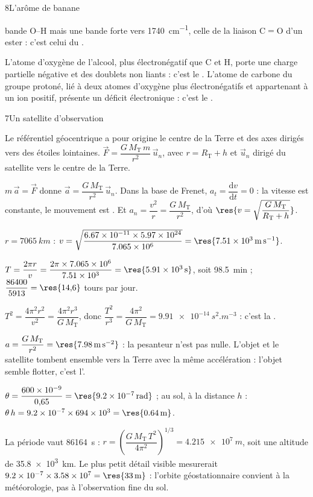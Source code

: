 \begin{corrigeBac}{8}{L'arôme de banane}
\begin{questions}
bande O--H mais une bande forte vers \qty{1740}{cm^{-1}}, celle de la liaison C$=$O d'un ester : c'est celui du . 
\item L'atome d'oxygène de l'alcool, plus électronégatif que C et H, porte une charge partielle négative et des doublets non
liants : c'est le . L'atome de carbone du groupe protoné, lié à deux atomes d'oxygène plus électronégatifs
et appartenant à un ion positif, présente un déficit électronique : c'est le . \pts{1 pt}
\end{questions}
\end{corrigeBac}

\begin{corrigeBac}{7}{Un satellite d'observation}
\begin{questions}
\item Le référentiel géocentrique a pour origine le centre de la Terre et des axes dirigés vers des étoiles lointaines.
$\vec F=\dfrac{G\,M_\mathrm{T}\,m}{r^2}\,\vec u_n$, avec $r=R_\mathrm{T}+h$ et $\vec u_n$ dirigé du satellite vers le centre de la Terre. 
\item $m\,\vec a=\vec F$ donne $\vec a=\dfrac{G\,M_\mathrm{T}}{r^2}\,\vec u_n$. Dans la base de Frenet, $a_t=\dfrac{\mathrm{d}v}{\mathrm{d}t}=0$ : la vitesse est constante, le
mouvement est . Et $a_n=\dfrac{v^2}{r}=\dfrac{G\,M_\mathrm{T}}{r^2}$, d'où $\res{v=\sqrt{\dfrac{G\,M_\mathrm{T}}{R_\mathrm{T}+h}}}$. 
\item $r=\qty{7065}{km}$ : $v=\sqrt{\dfrac{\num{6.67e-11}\times\num{5.97e24}}{\num{7.065e6}}}=\res{\qty{7,51e3}{m.s^{-1}}}$. 
\item $T=\dfrac{2\pi r}{v}=\dfrac{2\pi\times\num{7.065e6}}{\num{7.51e3}}=\res{\qty{5,91e3}{s}}$, soit \qty{98,5}{min} ; $\dfrac{86400}{5913}=\res{14{,}6}$ tours par jour. \pts{1 pt}
\item $T^2=\dfrac{4\pi^2r^2}{v^2}=\dfrac{4\pi^2r^3}{G\,M_\mathrm{T}}$, donc $\dfrac{T^2}{r^3}=\dfrac{4\pi^2}{G\,M_\mathrm{T}}=\qty{9,91e-14}{s^2.m^{-3}}$ : c'est la . 
\item $a=\dfrac{G\,M_\mathrm{T}}{r^2}=\res{\qty{7,98}{m.s^{-2}}}$ : la pesanteur n'est pas nulle. L'objet et le satellite tombent ensemble vers la
Terre avec la même accélération : l'objet semble flotter, c'est l'. 
\item $\theta=\dfrac{\num{600e-9}}{0{,}65}=\res{\qty{9,2e-7}{rad}}$ ; au sol, à la distance $h$ : $\theta\,h=\num{9.2e-7}\times\num{694e3}=\res{\qty{0,64}{m}}$. \pts{1 pt}
\item La période vaut \qty{86164}{s} : $r=\left(\dfrac{G\,M_\mathrm{T}\,T^2}{4\pi^2}\right)^{1/3}=\qty{4,215e7}{m}$, soit une altitude de \qty{35,8e3}{km}. Le plus petit détail
visible mesurerait $\num{9.2e-7}\times\num{3.58e7}=\res{\qty{33}{m}}$ : l'orbite géostationnaire convient à la météorologie, pas à
l'observation fine du sol. 
\end{questions}
\end{corrigeBac}

